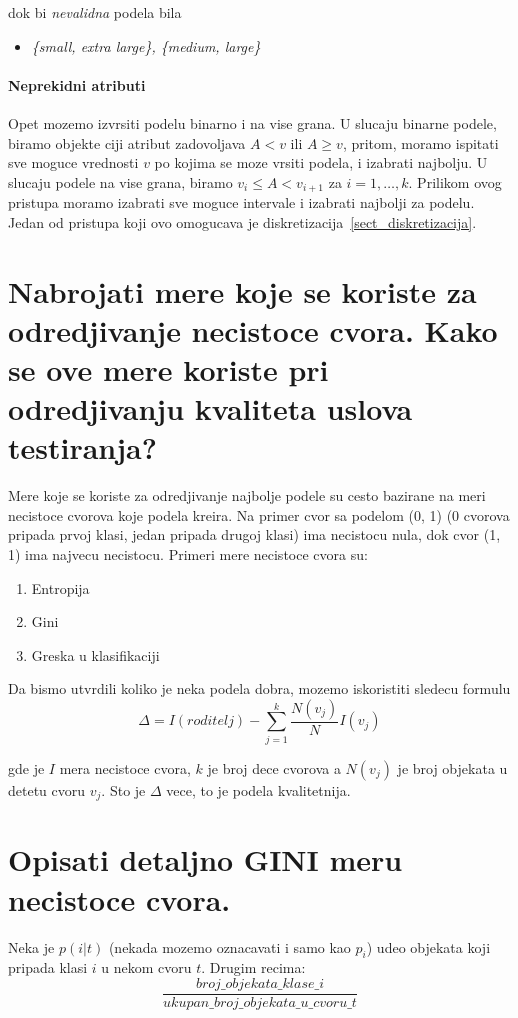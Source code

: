 \documentclass[a4paper]{article}
\begin{document}
dok bi \emph{nevalidna} podela bila
\begin{itemize}
    \item \emph{\{small, extra large\}, \{medium, large\}}
\end{itemize}

\paragraph{Neprekidni atributi} Opet mozemo izvrsiti podelu binarno i na vise grana. U slucaju
binarne podele, biramo objekte ciji atribut zadovoljava \(A < v\) ili  \(A \geqslant v\), pritom,
moramo ispitati sve moguce vrednosti \(v\) po kojima se moze vrsiti podela, i izabrati najbolju. U
slucaju podele na vise grana, biramo \(v_i \leqslant A < v_{i+1}\) za \(i=1,\ldots,k\). Prilikom
ovog pristupa moramo izabrati sve moguce intervale i izabrati najbolji za podelu. Jedan od pristupa
koji ovo omogucava je diskretizacija~\ref{sect_diskretizacija}.

\section{Nabrojati mere koje se koriste za odredjivanje necistoce cvora. Kako se ove mere koriste
pri odredjivanju kvaliteta uslova testiranja?}
Mere koje se koriste za odredjivanje najbolje podele su cesto bazirane na meri necistoce cvorova
koje podela kreira. Na primer cvor sa podelom (0, 1) (0 cvorova pripada prvoj klasi, jedan pripada
drugoj klasi) ima necistocu nula, dok cvor (1, 1) ima najvecu necistocu. Primeri mere necistoce
cvora su:
\begin{enumerate}
    \item Entropija
    \item Gini
    \item Greska u klasifikaciji
\end{enumerate}

Da bismo utvrdili koliko je neka podela dobra, mozemo iskoristiti sledecu formulu
\begin{equation}
    \label{eq:dobit}
    \Delta = I(roditelj) - \sum_{j=1}^{k} \dfrac{N(v_j)}{N}I(v_j)
\end{equation}

gde je \(I\) mera necistoce cvora, \(k\) je broj dece cvorova a \(N(v_j)\) je broj objekata u
detetu cvoru \(v_j\). Sto je \(\Delta\) vece, to je podela kvalitetnija.

\section{Opisati detaljno GINI meru necistoce cvora.}
Neka je \(p(i|t)\) (nekada mozemo oznacavati i samo kao \(p_i\)) udeo objekata koji pripada klasi
\(i\) u nekom cvoru \(t\). Drugim recima:
\[
    \dfrac{broj\_objekata\_klase\_i}{ukupan\_broj\_objekata\_u\_cvoru\_t}
\]
\end{document}

